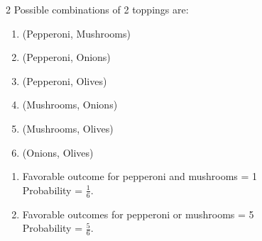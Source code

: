 \begin{multicols}{2}
Possible combinations of 2 toppings are:
\vspace{-1em}
\begin{enumerate}
   \item (Pepperoni, Mushrooms)
   \item (Pepperoni, Onions)
   \item (Pepperoni, Olives)
   \item (Mushrooms, Onions)
   \item (Mushrooms, Olives)
   \item (Onions, Olives)
\end{enumerate}

\begin{enumerate}[leftmargin=*, label=$(\roman*)$, itemsep=1em]
   \item Favorable outcome for pepperoni and mushrooms = 1\\
   Probability = $\frac{1}{6}$.

   \item Favorable outcomes for pepperoni or mushrooms = 5\\
   Probability = $\frac{5}{6}$.
\end{enumerate}
\end{multicols}

\pagebreak

